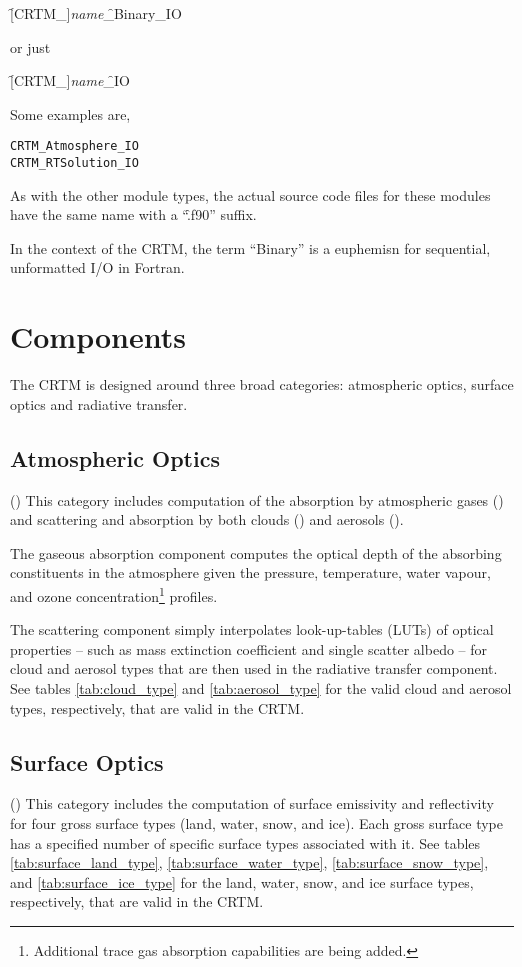 \hspace{0.5cm}\f{[CRTM\_]}\textit{name}\f{\_Binary\_IO}

or just

\hspace{0.5cm}\f{[CRTM\_]}\textit{name}\f{\_IO}

Some examples are,
\begin{alltt}
  CRTM_Atmosphere_IO
  CRTM_RTSolution_IO\end{alltt}
As with the other module types, the actual source code files for these modules have the same name with a ``\f{.f90}'' suffix.

In the context of the CRTM, the term ``Binary'' is a euphemisn for sequential, unformatted I/O in Fortran.


\section{Components}
The CRTM is designed around three broad categories: atmospheric optics, surface optics and radiative transfer.

\subsection{Atmospheric Optics}
(\AtmOptics) This category includes computation of the absorption by atmospheric gases (\AtmAbsorption) and scattering and absorption by both clouds (\CloudScatter) and aerosols (\AerosolScatter).

The gaseous absorption component computes the optical depth of the absorbing constituents in the atmosphere given the pressure, temperature, water vapour, and ozone concentration\footnote{Additional trace gas absorption capabilities are being added.} profiles.

The scattering component simply interpolates look-up-tables (LUTs) of optical properties -- such as mass extinction coefficient and single scatter albedo -- for cloud and aerosol types that are then used in the radiative transfer component. See tables \ref{tab:cloud_type} and \ref{tab:aerosol_type} for the valid cloud and aerosol types, respectively, that are valid in the CRTM.


\subsection{Surface Optics}
(\SfcOptics) This category includes the computation of surface emissivity and reflectivity for four gross surface types (land, water, snow, and ice). Each gross surface type has a specified number of specific surface types associated with it. See tables \ref{tab:surface_land_type}, \ref{tab:surface_water_type}, \ref{tab:surface_snow_type}, and \ref{tab:surface_ice_type} for the land, water, snow, and ice surface types, respectively, that are valid in the CRTM.

